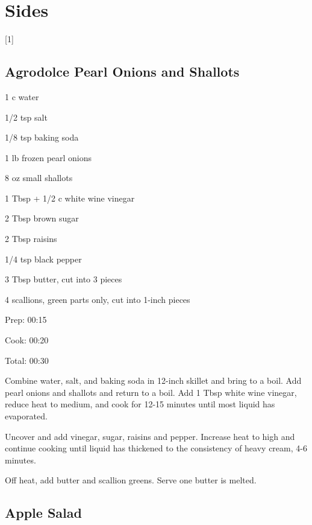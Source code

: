 \documentclass[oneside]{book}  %
\def\thisrecipe{}  %
\newcommand{\chapterrec}[1]{  %
  \newpage \def\thisrecipe{} \chapter{#1} \vspace{1.1em}
}
\newcommand{\chaptertoc}[1]{  %
  \chapterrec{#1} \vspace{-1.1em}  %
  \startcontents[chapters] \printcontents[chapters]{chapter_toc_}{1}[1]{}
}
\newcommand{\recipe}[1]{\section{#1}\def\thisrecipe{: #1}} %
\begin{document}
\chaptertoc{Sides} \label{chap:sides}
\recipe{Agrodolce Pearl Onions and Shallots} \label{recipe:agrodolce_pearl_onions_and_shallots} %

\begin{IT}
  \begin{ingredients}
    \item[1 c] water
    \item[1/2 tsp] salt
    \item[1/8 tsp] baking soda
    \item[1 lb] frozen pearl onions
    \item[8 oz] small shallots

    \item[1 Tbsp + 1/2 c] white wine vinegar
    \item[2 Tbsp] brown sugar
    \item[2 Tbsp] raisins
    \item[1/4 tsp] black pepper
    \item[3 Tbsp] butter, cut into 3 pieces
    \item[4] scallions, green parts only, cut into 1-inch pieces
  \end{ingredients}

  \switchcolumn

  \begin{timeline}
    \item[Prep:]  00:15
    \item[Cook:]  00:20
    \item[Total:] 00:30
  \end{timeline}
\end{IT}

\begin{directions}
  \item Combine water, salt, and baking soda in 12-inch skillet and bring to a
  boil. Add pearl onions and shallots and return to a boil. Add 1 Tbsp white
  wine vinegar, reduce heat to medium, and cook for 12-15 minutes until most
  liquid has evaporated.

  \item Uncover and add vinegar, sugar, raisins and pepper. Increase heat to
  high and continue cooking until liquid has thickened to the consistency of
  heavy cream, 4-6 minutes.

  \item Off heat, add butter and scallion greens. Serve one butter is melted.
\end{directions}
\recipe{Apple Salad} \label{recipe:apple_salad} %
\end{document}
